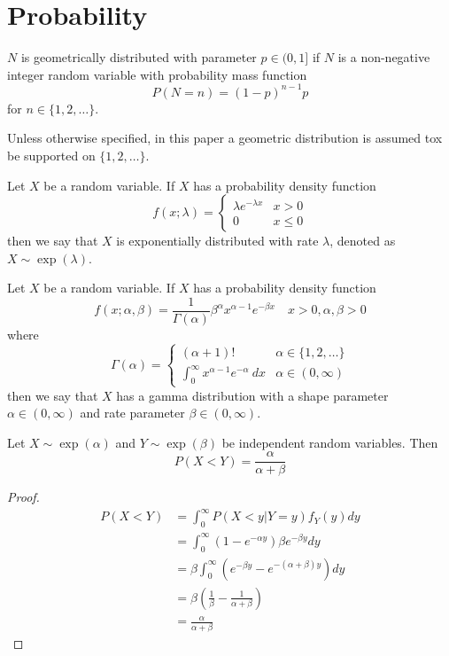 \section{Probability}

\begin{defn}
$N$ is geometrically distributed with parameter $p \in (0,1]$ if $N$ is a non-negative integer random variable with probability mass function
$$
P(N = n) = (1 - p)^{n - 1} p
$$
for $n \in \{1,2,\ldots\}$.

Unless otherwise specified, in this paper a geometric distribution is assumed tox be supported on $\{1,2,\ldots\}$.
\end{defn}

\begin{defn}
Let $X$ be a random variable.
If $X$ has a probability density function
$$
f(x; \lambda) = \begin{cases}
    \lambda e^{-\lambda x} & x > 0\\
    0 & x \leq 0
    \end{cases}
$$
then we say that $X$ is exponentially distributed with rate $\lambda$, denoted as $X \sim \exp(\lambda)$.
\end{defn}

\begin{defn}
Let $X$ be a random variable.
If $X$ has a probability density function
$$
f(x; \alpha, \beta) = \frac{1}{\Gamma(\alpha)} \beta^\alpha x^{\alpha - 1} e^{-\beta x} \quad x > 0, \alpha, \beta > 0
$$
where
$$
\Gamma(\alpha) = \begin{cases}
    (\alpha + 1) ! & \alpha \in \{1,2,\ldots\}\\
    \int_{0}^\infty x^{\alpha - 1} e^{-\alpha} ~dx & \alpha \in (0, \infty)
\end{cases}
$$
then we say that $X$ has a gamma distribution with a shape parameter $\alpha \in (0, \infty)$ and rate parameter $\beta \in (0, \infty)$.
\end{defn}

\begin{theorem}\label{thm:exp_x_less_y}
Let $X \sim \exp(\alpha)$ and $Y \sim \exp(\beta)$ be independent random variables.
Then
$$
P(X < Y) = \frac{\alpha}{\alpha + \beta}
$$
\end{theorem}

\begin{proof}
\begin{align*}
    P(X < Y) &= \int_0^\infty P(X < y | Y = y) f_Y(y) dy\\
    &= \int_0^\infty (1 - e^{-\alpha y}) \beta e^{-\beta y} dy\\
    &= \beta \int_0^\infty \left( e^{-\beta y} - e^{-(\alpha + \beta) y}\right) dy\\
    &= \beta \left(\frac{1}{\beta} - \frac{1}{\alpha + \beta}\right)\\
    &= \frac{\alpha}{\alpha + \beta}
\end{align*}
\end{proof}

